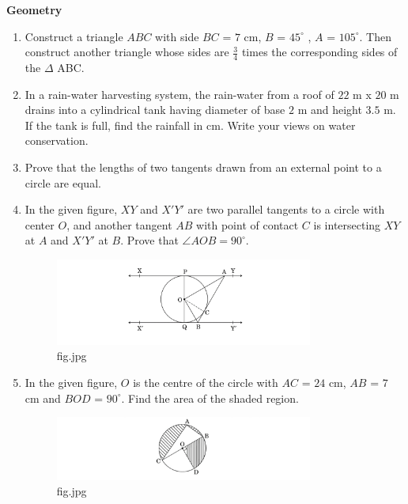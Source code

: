 \documentclass{article}                                                                                                                                   \usepackage{graphicx}
\begin{document}
                                                                                                                                                                                                                                                                                                                    \begin {center}                               \textbf{Geometry}
\end {center}                                                                            \begin{enumerate}                                      \item Construct a triangle $ABC$ with side $BC$ = $7$ cm, \angle $B$ = $45^{\circ}$ , \angle $A$ = $105^{\circ}$. Then construct another triangle whose sides are $\frac{3}{4}$ times the corresponding sides of the $\Delta$ ABC.                                  \item In a rain-water harvesting system, the rain-water from a roof of $22$ m x $20$ m drains into a cylindrical tank having diameter of base $2$ m and height $3.5$ m. If the tank is full, find the rainfall in cm. Write your views on water conservation.                       \item Prove that the lengths of two tangents drawn from an external point to a circle are equal.                                          \item In the given figure, $XY$ and $X'Y'$ are two parallel tangents to a circle with center $O$, and another tangent $AB$ with point of contact $C$ is intersecting $XY$ at $A$ and $X'Y'$ at $B$. Prove that \(\angle AOB = 90^\circ\).
 \begin{figure}[h!]                             \centering                                    \includegraphics[width=0.8\textwidth]{figjpg.jpg}                             \caption{fig.jpg}                             \label{fig:fig.jpg}           \end{figure}
 \item In the given figure, $O$ is the centre of the circle with $AC$ = $24$ cm, $AB$ = $7$ cm and \angle $BOD$ = $90^{\circ}$. Find the area of the shaded region.                              \begin{figure}[h!]                                \centering                                    \includegraphics[width=0.8\textwidth]{figjpg (1).jpg}

                \caption{fig.jpg}                             \label{fig:fig.jpg}                   \end{figure}
 \end{enumerate}
\end{document}
